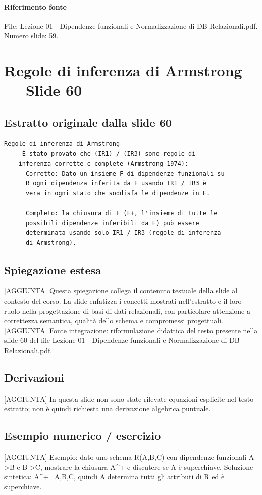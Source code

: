 \documentclass[11pt]{article}
\begin{document}
\paragraph{Riferimento fonte} File: Lezione 01 - Dipendenze funzionali e Normalizzazione di DB Relazionali.pdf. Numero slide: 59.
\section{Regole di inferenza di Armstrong --- Slide 60}
\subsection*{Estratto originale dalla slide 60}
\begin{lstlisting}
Regole di inferenza di Armstrong
-    È stato provato che (IR1) / (IR3) sono regole di
    inferenza corrette e complete (Armstrong 1974):
      Corretto: Dato un insieme F di dipendenze funzionali su
      R ogni dipendenza inferita da F usando IR1 / IR3 è
      vera in ogni stato che soddisfa le dipendenze in F.

      Completo: la chiusura di F (F+, l'insieme di tutte le
      possibili dipendenze inferibili da F) può essere
      determinata usando solo IR1 / IR3 (regole di inferenza
      di Armstrong).
\end{lstlisting}
\subsection*{Spiegazione estesa}
[AGGIUNTA] Questa spiegazione collega il contenuto testuale della slide al contesto del corso. La slide enfatizza i concetti mostrati nell'estratto e il loro ruolo nella progettazione di basi di dati relazionali, con particolare attenzione a correttezza semantica, qualità dello schema e compromessi progettuali.
[AGGIUNTA] Fonte integrazione: riformulazione didattica del testo presente nella slide 60 del file Lezione 01 - Dipendenze funzionali e Normalizzazione di DB Relazionali.pdf.
\subsection*{Derivazioni}
[AGGIUNTA] In questa slide non sono state rilevate equazioni esplicite nel testo estratto; non è quindi richiesta una derivazione algebrica puntuale.
\subsection*{Esempio numerico / esercizio}
[AGGIUNTA] Esempio: dato uno schema R(A,B,C) con dipendenze funzionali A->B e B->C, mostrare la chiusura A^+ e discutere se A è superchiave. Soluzione sintetica: A^+={A,B,C}, quindi A determina tutti gli attributi di R ed è superchiave.
\end{document}
